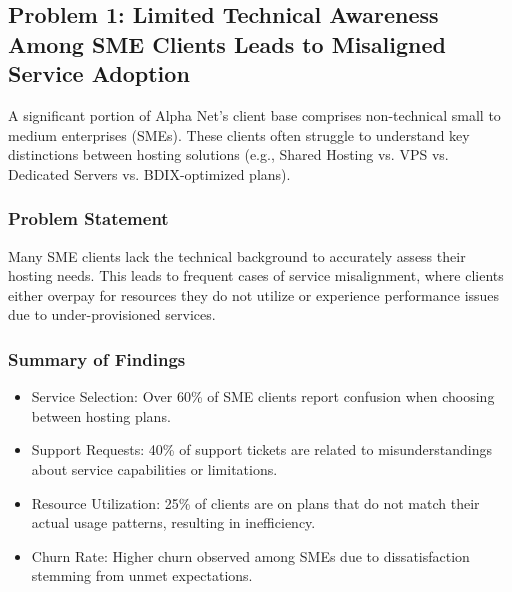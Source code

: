 \subsection{Problem 1: Limited Technical Awareness Among SME Clients Leads to Misaligned Service Adoption}
A significant portion of Alpha Net's client base comprises non-technical small to medium enterprises (SMEs). These clients often struggle to understand key distinctions between hosting solutions (e.g., Shared Hosting vs. VPS vs. Dedicated Servers vs. BDIX-optimized plans).

\subsubsection*{Problem Statement}
Many SME clients lack the technical background to accurately assess their hosting needs. This leads to frequent cases of service misalignment, where clients either overpay for resources they do not utilize or experience performance issues due to under-provisioned services.

\subsubsection*{Summary of Findings}
\begin{itemize}
    \item Service Selection: Over 60\% of SME clients report confusion when choosing between hosting plans.
    \item Support Requests: 40\% of support tickets are related to misunderstandings about service capabilities or limitations.
    \item Resource Utilization: 25\% of clients are on plans that do not match their actual usage patterns, resulting in inefficiency.
    \item Churn Rate: Higher churn observed among SMEs due to dissatisfaction stemming from unmet expectations.
\end{itemize}

